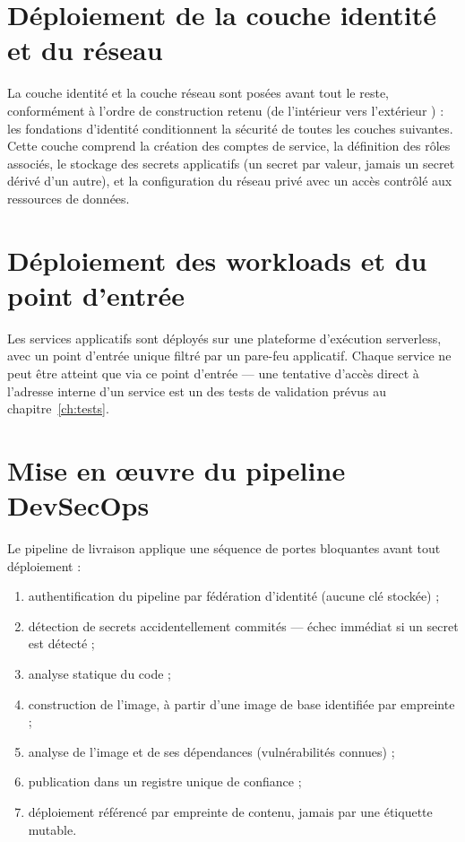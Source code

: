 \section{Déploiement de la couche identité et du réseau}

La couche identité et la couche réseau sont posées avant tout le reste, conformément à
l'ordre de construction retenu (\og de l'intérieur vers l'extérieur \fg{}) : les fondations
d'identité conditionnent la sécurité de toutes les couches suivantes. Cette couche comprend
la création des comptes de service, la définition des rôles associés, le stockage des
secrets applicatifs (un secret par valeur, jamais un secret dérivé d'un autre), et la
configuration du réseau privé avec un accès contrôlé aux ressources de données.

\section{Déploiement des workloads et du point d'entrée}

Les services applicatifs sont déployés sur une plateforme d'exécution serverless, avec un
point d'entrée unique filtré par un pare-feu applicatif. Chaque service ne peut être atteint
que via ce point d'entrée --- une tentative d'accès direct à l'adresse interne d'un service
est un des tests de validation prévus au chapitre~\ref{ch:tests}.

\section{Mise en œuvre du pipeline DevSecOps}

Le pipeline de livraison applique une séquence de portes bloquantes avant tout déploiement :

\begin{enumerate}
  \item authentification du pipeline par fédération d'identité (aucune clé stockée) ;
  \item détection de secrets accidentellement commités --- échec immédiat si un secret est
        détecté ;
  \item analyse statique du code ;
  \item construction de l'image, à partir d'une image de base identifiée par empreinte ;
  \item analyse de l'image et de ses dépendances (vulnérabilités connues) ;
  \item publication dans un registre unique de confiance ;
  \item déploiement référencé par empreinte de contenu, jamais par une étiquette mutable.
\end{enumerate}

